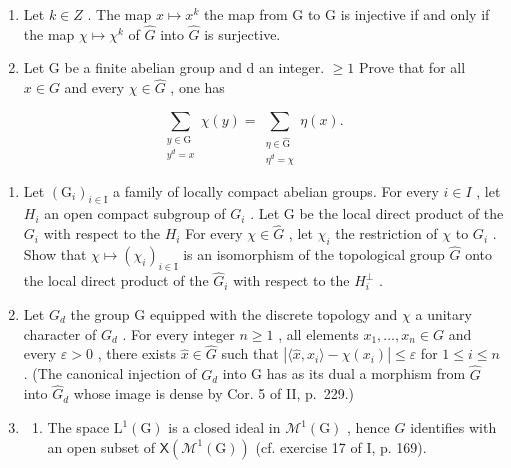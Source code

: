 \begin{enumerate}
\def\labelenumi{\arabic{enumi})}
\setcounter{enumi}{9}
\item
  Let \(k \in Z\) . The map \(x \mapsto x^{k}\) the map from G to G is injective if and only if the map \(\chi \mapsto \chi^{k}\) of \(\widehat{G}\) into \(\widehat{G}\) is surjective.
\item
  Let G be a finite abelian group and d an integer. \(\geqslant 1\) Prove that for all \(x \in G\) and every \(\chi \in \widehat{G}\) , one has
\end{enumerate}

\[
\sum_{\substack{y\in \mathrm{G}\\ y^{d} = x}}\chi (y) = \sum_{\substack{\eta \in \widehat{\mathrm{G}}\\ \eta^{d} = \chi}}\eta (x).
\]

\begin{enumerate}
\def\labelenumi{\arabic{enumi})}
\setcounter{enumi}{11}
\item
  Let \((\mathrm{G}_{i})_{i\in\mathrm{I}}\) a family of locally compact abelian groups. For every \(i\in I\) , let \(H_{i}\) an open compact subgroup of \(G_{i}\) . Let G be the local direct product of the \(G_{i}\) with respect to the \(H_{i}\) For every \(\chi\in\widehat{G}\) , let \(\chi_{i}\) the restriction of \(\chi\) to \(G_{i}\) . Show that \(\chi\mapsto(\chi_{i})_{i\in\mathrm{I}}\) is an isomorphism of the topological group \(\widehat{G}\) onto the local direct product of the \(\widehat{G}_{i}\) with respect to the \(H_{i}^{\perp}\) .
\item
  Let \(G_{d}\) the group G equipped with the discrete topology and \(\chi\) a unitary character of \(G_{d}\) . For every integer \(n \geqslant 1\) , all elements \(x_{1}, \ldots, x_{n} \in G\) and every \(\varepsilon > 0\) , there exists \(\widehat{x} \in \widehat{G}\) such that \(|\langle\widehat{x}, x_{i}\rangle - \chi(x_{i})| \leqslant \varepsilon\) for \(1 \leqslant i \leqslant n\) . (The canonical injection of \(G_{d}\) into G has as its dual a morphism from \(\widehat{G}\) into \(\widehat{G}_{d}\) whose image is dense by Cor. 5 of II, p.~229.)
\item
  \begin{enumerate}
  \def\labelenumii{\alph{enumii})}
  \tightlist
  \item
    The space \(\mathrm{L}^{1}(\mathrm{G})\) is a closed ideal in \(\mathcal{M}^{1}(\mathrm{G})\) , hence \(\widehat{G}\) identifies with an open subset of \(\mathsf{X}(\mathcal{M}^{1}(\mathrm{G}))\) (cf. exercise 17 of I, p. 169).
  \end{enumerate}
\end{enumerate}

